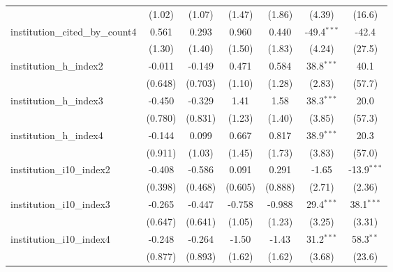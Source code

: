 \begin{tabular}{lcccccc}
                                         & (1.02)        & (1.07)        & (1.47)        & (1.86)        & (4.39)        & (16.6)\\   
   institution\_cited\_by\_count4        & 0.561         & 0.293         & 0.960         & 0.440         & -49.4$^{***}$ & -42.4\\   
                                         & (1.30)        & (1.40)        & (1.50)        & (1.83)        & (4.24)        & (27.5)\\   
   institution\_h\_index2                & -0.011        & -0.149        & 0.471         & 0.584         & 38.8$^{***}$  & 40.1\\   
                                         & (0.648)       & (0.703)       & (1.10)        & (1.28)        & (2.83)        & (57.7)\\   
   institution\_h\_index3                & -0.450        & -0.329        & 1.41          & 1.58          & 38.3$^{***}$  & 20.0\\   
                                         & (0.780)       & (0.831)       & (1.23)        & (1.40)        & (3.85)        & (57.3)\\   
   institution\_h\_index4                & -0.144        & 0.099         & 0.667         & 0.817         & 38.9$^{***}$  & 20.3\\   
                                         & (0.911)       & (1.03)        & (1.45)        & (1.73)        & (3.83)        & (57.0)\\   
   institution\_i10\_index2              & -0.408        & -0.586        & 0.091         & 0.291         & -1.65         & -13.9$^{***}$\\   
                                         & (0.398)       & (0.468)       & (0.605)       & (0.888)       & (2.71)        & (2.36)\\   
   institution\_i10\_index3              & -0.265        & -0.447        & -0.758        & -0.988        & 29.4$^{***}$  & 38.1$^{***}$\\   
                                         & (0.647)       & (0.641)       & (1.05)        & (1.23)        & (3.25)        & (3.31)\\   
   institution\_i10\_index4              & -0.248        & -0.264        & -1.50         & -1.43         & 31.2$^{***}$  & 58.3$^{**}$\\   
                                         & (0.877)       & (0.893)       & (1.62)        & (1.62)        & (3.68)        & (23.6)\\   

\end{tabular}
